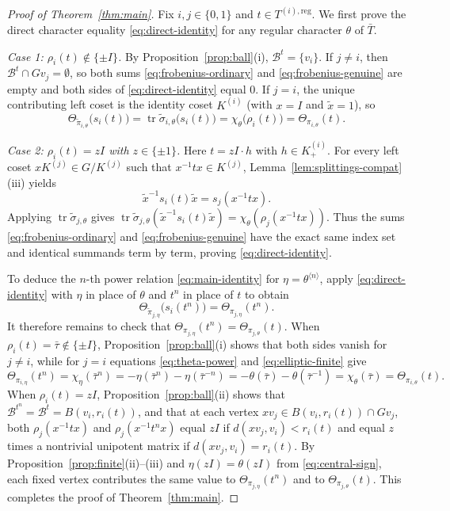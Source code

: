 \documentclass[12pt, letterpaper]{article}
\numberwithin{equation}{section}
\theoremstyle{definition}
\theoremstyle{remark}
\newcommand{\tr}{\operatorname{tr}}
\begin{document}
\begin{proof}[Proof of Theorem~\ref{thm:main}]
Fix $i,j\in\{0,1\}$ and $t\in T^{(i),\mathrm{reg}}$. We first prove the direct character equality \eqref{eq:direct-identity} for any regular character $\theta$ of $\bar{T}$.

\emph{Case 1: $\rho_i(t)\notin\{\pm I\}$.} By Proposition~\ref{prop:ball}(i), $\mathscr{B}^t=\{v_i\}$. If $j\ne i$, then $\mathscr{B}^t\cap Gv_j=\emptyset$, so both sums \eqref{eq:frobenius-ordinary} and \eqref{eq:frobenius-genuine} are empty and both sides of \eqref{eq:direct-identity} equal $0$. If $j=i$, the unique contributing left coset is the identity coset $K^{(i)}$ (with $x=I$ and $\widetilde{x}=1$), so
\[
 \Theta_{\widetilde{\pi}_{i,\theta}}\bigl(s_i(t)\bigr)
 =\tr\widetilde{\sigma}_{i,\theta}\bigl(s_i(t)\bigr)
 =\chi_\theta\bigl(\rho_i(t)\bigr)
 =\Theta_{\pi_{i,\theta}}(t).
\]

\emph{Case 2: $\rho_i(t)=zI$ with $z\in\{\pm 1\}$.} Here $t=zI\cdot h$ with $h\in K^{(i)}_+$. For every left coset $xK^{(j)}\in G/K^{(j)}$ such that $x^{-1}tx\in K^{(j)}$, Lemma~\ref{lem:splittings-compat}(iii) yields
\[
 \widetilde{x}^{-1}s_i(t)\widetilde{x}=s_j(x^{-1}tx).
\]
Applying $\tr\widetilde{\sigma}_{j,\theta}$ gives $\tr\widetilde{\sigma}_{j,\theta}(\widetilde{x}^{-1}s_i(t)\widetilde{x})=\chi_\theta(\rho_j(x^{-1}tx))$. Thus the sums \eqref{eq:frobenius-ordinary} and \eqref{eq:frobenius-genuine} have the exact same index set and identical summands term by term, proving \eqref{eq:direct-identity}.

To deduce the $n$-th power relation \eqref{eq:main-identity} for $\eta=\theta^{\langle n\rangle}$, apply \eqref{eq:direct-identity} with $\eta$ in place of $\theta$ and $t^n$ in place of $t$ to obtain
\[
 \Theta_{\widetilde{\pi}_{j,\eta}}\bigl(s_i(t^n)\bigr)=\Theta_{\pi_{j,\eta}}(t^n).
\]
It therefore remains to check that $\Theta_{\pi_{j,\eta}}(t^n)=\Theta_{\pi_{j,\theta}}(t)$. When $\rho_i(t)=\bar{\tau}\notin\{\pm I\}$, Proposition~\ref{prop:ball}(i) shows that both sides vanish for $j\ne i$, while for $j=i$ equations \eqref{eq:theta-power} and \eqref{eq:elliptic-finite} give
\[
 \Theta_{\pi_{i,\eta}}(t^n)=\chi_\eta(\bar{\tau}^n)=-\eta(\bar{\tau}^n)-\eta(\bar{\tau}^{-n})=-\theta(\bar{\tau})-\theta(\bar{\tau}^{-1})=\chi_\theta(\bar{\tau})=\Theta_{\pi_{i,\theta}}(t).
\]
When $\rho_i(t)=zI$, Proposition~\ref{prop:ball}(ii) shows that $\mathscr{B}^{t^n}=\mathscr{B}^t=B(v_i,r_i(t))$, and that at each vertex $xv_j\in B(v_i,r_i(t))\cap Gv_j$, both $\rho_j(x^{-1}tx)$ and $\rho_j(x^{-1}t^nx)$ equal $zI$ if $d(xv_j,v_i)<r_i(t)$ and equal $z$ times a nontrivial unipotent matrix if $d(xv_j,v_i)=r_i(t)$. By Proposition~\ref{prop:finite}(ii)--(iii) and $\eta(zI)=\theta(zI)$ from \eqref{eq:central-sign}, each fixed vertex contributes the same value to $\Theta_{\pi_{j,\eta}}(t^n)$ and to $\Theta_{\pi_{j,\theta}}(t)$. This completes the proof of Theorem~\ref{thm:main}.
\end{proof}
\end{document}
